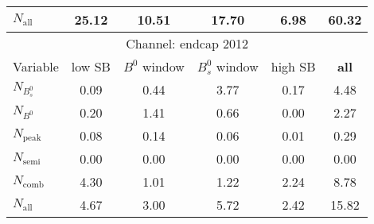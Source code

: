 \begin{table}
\begin{tabular}{|l|c|c|c|c|c|}
\hline 
$N_{\mathrm{all}}$ & 25.12 & 10.51 & 17.70 & 6.98 & 60.32  \\ 
\hline 
\hline 
 \multicolumn{6}{|c|}{Channel: endcap 2012} \\ 
\hline 
Variable  & low SB & $B^0$ window & $B_s^0$ window & high SB & \textbf{all} \\ 
\hline 
$N_{B_s^0}$ & 0.09 & 0.44 & 3.77 & 0.17 & 4.48  \\ 
$N_{B^0}$ & 0.20 & 1.41 & 0.66 & 0.00 & 2.27  \\ 
$N_{\mathrm{peak}}$ & 0.08 & 0.14 & 0.06 & 0.01 & 0.29  \\ 
$N_{\mathrm{semi}}$ & 0.00 & 0.00 & 0.00 & 0.00 & 0.00  \\ 
$N_{\mathrm{comb}}$ & 4.30 & 1.01 & 1.22 & 2.24 & 8.78  \\ 
\hline 
$N_{\mathrm{all}}$ & 4.67 & 3.00 & 5.72 & 2.42 & 15.82  \\ 
\hline 
\end{tabular} 
\end{table} 
